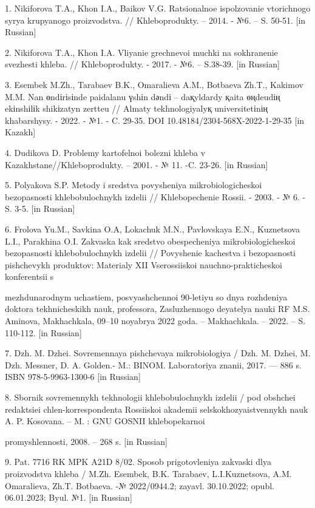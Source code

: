 \begin{noparindent}
1. Nikiforova T.A., Khon I.A., Baikov V.G. Ratsional\textquotesingle noe
ispol\textquotesingle zovanie vtorichnogo syr\textquotesingle ya
krupyanogo proizvodstva. // Khleboprodukty. -- 2014. - №6. -- S. 50-51.
{[}in Russian{]}

2. Nikiforova T.A., Khon I.A. Vliyanie grechnevoi muchki na sokhranenie
svezhesti khleba. // Khleboprodukty. - 2017. - №6. -- S.38-39. {[}in
Russian{]}

3. Esembek M.Zh., Tarabaev B.K., Omaralieva A.M., Botbaeva Zh.T.,
Kakimov M.M. Nan өndіrіsіnde paidalanu үshіn dәndі -- daқyldardy қaita
өңdeudің ekіnshіlіk shikіzatyn zertteu // Almaty tekhnologiyalyқ
universitetіnің khabarshysy. - 2022. - №1. - C. 29-35. DOI
10.48184/2304-568X-2022-1-29-35 {[}in Kazakh{]}

4. Dudikova D. Problemy kartofel\textquotesingle noi bolezni khleba v
Kazakhstane//Khleboprodukty. -- 2001. - № 11. -C. 23-26. {[}in
Russian{]}

5. Polyakova S.P. Metody i sredstva povysheniya mikrobiologicheskoi
bezopasnosti khlebobulochnykh izdelii // Khlebopechenie Rossii. - 2003.
- № 6. - S. 3-5. {[}in Russian{]}

6. Frolova Yu.M., Savkina O.A, Lokachuk M.N., Pavlovskaya E.N.,
Kuznetsova L.I., Parakhina O.I. Zakvaska kak sredstvo obespecheniya
mikrobiologicheskoi bezopasnosti khlebobulochnykh izdelii // Povyshenie
kachestva i bezopasnosti pishchevykh produktov: Materialy XII
Vserossiiskoi nauchno-prakticheskoi konferentsii s

mezhdunarodnym
uchastiem, posvyashchennoi 90-letiyu so dnya rozhdeniya doktora
tekhnicheskikh nauk, professora, Zasluzhennogo deyatelya nauki RF M.S.
Aminova, Makhachkala, 09--10 noyabrya 2022 goda. -- Makhachkala. --
2022. -- S. 110-112. {[}in Russian{]}

7. Dzh. M. Dzhei. Sovremennaya pishchevaya mikrobiologiya / Dzh. M.
Dzhei, M. Dzh. Messner, D. A. Gol\textquotesingle den.- M.: BINOM.
Laboratoriya znanii, 2017. --- 886 s. ISBN 978-5-9963-1300-6 {[}in
Russian{]}

8. Sbornik sovremennykh tekhnologii khlebobulochnykh izdelii / pod
obshchei redaktsiei chlen-korrespondenta Rossiiskoi akademii
sel\textquotesingle skokhozyaistvennykh nauk A. P. Kosovana. -- M. : GNU
GOSNII khlebopekarnoi

promyshlennosti, 2008. -- 268 s. {[}in Russian{]}

9. Pat. 7716 RK MPK A21D 8/02. Sposob prigotovleniya zakvaski dlya
proizvodstva khleba / M.Zh. Esembek, B.K. Tarabaev, L.I.Kuznetsova, A.M.
Omaralieva, Zh.T. Botbaeva. -№ 2022/0944.2; zayavl. 30.10.2022; opubl.
06.01.2023; Byul. №1. {[}in Russian{]}


\end{noparindent}
